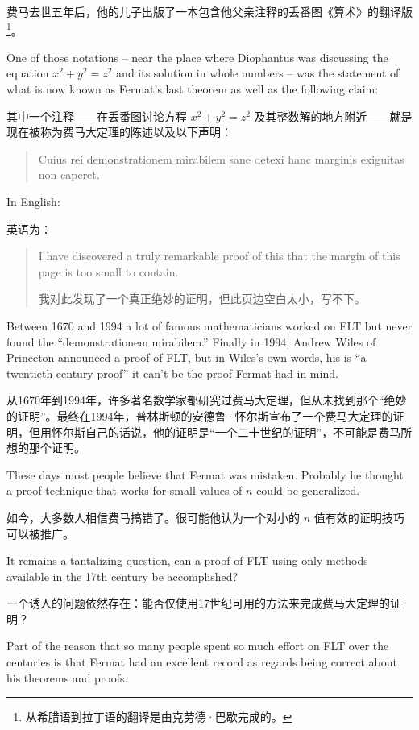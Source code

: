 费马去世五年后，他的儿子出版了一本包含他父亲注释的丢番图《算术》的翻译版\footnote{从希腊语到拉丁语的翻译是由克劳德·巴歇完成的。}。

One of
those notations -- near the place where Diophantus was discussing the
equation $x^2+y^2=z^2$ and its solution in whole numbers -- was the statement
of what is now known as Fermat's last theorem as well as the following claim:

其中一个注释——在丢番图讨论方程 $x^2+y^2=z^2$ 及其整数解的地方附近——就是现在被称为费马大定理的陈述以及以下声明：

\begin{quote}
Cuius rei demonstrationem mirabilem sane detexi hanc marginis exiguitas non caperet.
\end{quote}

In English:

英语为：

\begin{quote}
I have discovered a truly remarkable proof of this that the margin of this page is too small to contain.

我对此发现了一个真正绝妙的证明，但此页边空白太小，写不下。
\end{quote}

Between 1670 and 1994 a lot of famous mathematicians worked on FLT but
never found the ``demonstrationem mirabilem.''  Finally in 1994, Andrew Wiles
of Princeton announced a proof of FLT, but in Wiles's own words, his is ``a twentieth century proof'' it can't be the proof Fermat had in mind.

从1670年到1994年，许多著名数学家都研究过费马大定理，但从未找到那个“绝妙的证明”。最终在1994年，普林斯顿的安德鲁·怀尔斯宣布了一个费马大定理的证明，但用怀尔斯自己的话说，他的证明是“一个二十世纪的证明”，不可能是费马所想的那个证明。

These days most people believe that Fermat was mistaken.  Probably he thought
a proof technique that works for small values of $n$ could be generalized.

如今，大多数人相信费马搞错了。很可能他认为一个对小的 $n$ 值有效的证明技巧可以被推广。

It remains a tantalizing question, can a proof of FLT using only methods
available in the 17th century be accomplished?

一个诱人的问题依然存在：能否仅使用17世纪可用的方法来完成费马大定理的证明？

Part of the reason that so many people spent so much effort on FLT
over the centuries is that Fermat had an excellent record as regards
being correct about his theorems and proofs.

